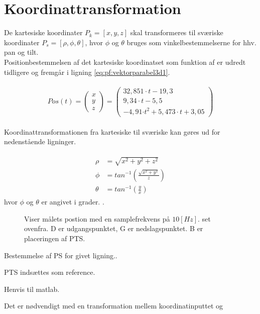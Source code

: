 \section{Koordinattransformation}
\label{sec:koordinattransformation}

De kartesiske koordinater $P_k=[x, y, z]$ skal transformeres til sværiske koordinater $P_s=[\rho, \phi, \theta]$, hvor $\phi$ og $\theta$ bruges som vinkelbestemmelserne for hhv. pan og tilt.\\

Positionbestemmelsen af det kartesiske koordinatset som funktion af er udredt tidligere og fremgår i ligning \ref{eq:pf:vektorparabel3d1}. 

\begin{align}
\begin{split}
Pos\left( t \right) =\left( \begin{matrix} x \\ y \\ z \end{matrix} \right) =\left( \begin{matrix} 32,851\cdot t-19,3 \\ 9,34\cdot t-5,5 \\ -4,91{ \cdot t }^{ 2 }+5,473\cdot t+3,05 \end{matrix} \right) 
\label{eq:pf:vektorparabel3d1}
\end{split}
\end{align}

Koordinattransformationen fra kartesiske til sværiske kan gøres ud for nedenstående ligninger.


\begin{align}
\begin{split}
\rho &=\sqrt { { x }^{ 2 } +{ y }^{ 2 }+{ z }^{ 2 }} 
\\
\phi &={ tan }^{ -1 }\left( \frac { \sqrt { { x }^{ 2 }+{ y }^{ 2 } }  }{ z }  \right) 
\\
\theta &={ tan }^{ -1 }\left( \frac { y }{ x }  \right) 
\label{eq:sv_koordi}
\end{split}
\end{align}
hvor $\phi$ og $\theta$ er angivet i grader. \citep[Kap. 10.6, s. 598]{adam}.

\begin{figure}[!th]
\centering
\begin{tikzpicture}[scale=2]

\end{tikzpicture}
\caption[tekst i indholdsfortegnelsen]{Viser målets postion med en samplefrekvens på $10[Hz]$.  set ovenfra. D er udgangspunktet, G er nedslagspunktet. B er placeringen af PTS.}
\label{fig:para_in_xy_plane}
\end{figure}




\bigskip



Bestemmelse af PS for givet ligning..


PTS indsættes som reference. 

Henvis til matlab. 




Det er nødvendigt med en transformation mellem koordinatinputtet og 
